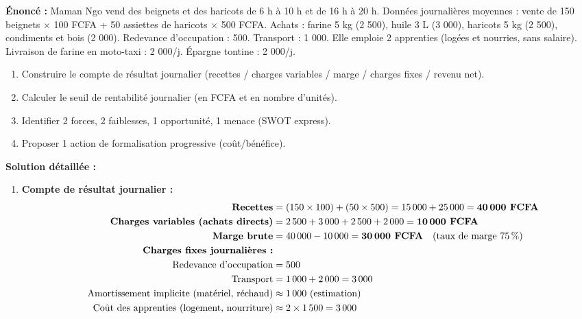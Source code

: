 \documentclass[11pt]{article}
\begin{document}
\begin{exoresolu}
    \textbf{Énoncé :} Maman Ngo vend des beignets et des haricots de 6 h à 10 h et de 16 h à 20 h. Données journalières moyennes : vente de 150 beignets $\times$ 100 FCFA + 50 assiettes de haricots $\times$ 500 FCFA. Achats : farine 5 kg (2 500), huile 3 L (3 000), haricots 5 kg (2 500), condiments et bois (2 000). Redevance d'occupation : 500. Transport : 1 000. Elle emploie 2 apprenties (logées et nourries, sans salaire). Livraison de farine en moto-taxi : 2 000/j. Épargne tontine : 2 000/j.
    \begin{enumerate}
        \item Construire le compte de résultat journalier (recettes / charges variables / marge / charges fixes / revenu net).
        \item Calculer le seuil de rentabilité journalier (en FCFA et en nombre d'unités).
        \item Identifier 2 forces, 2 faiblesses, 1 opportunité, 1 menace (SWOT express).
        \item Proposer 1 action de formalisation progressive (coût/bénéfice).
    \end{enumerate}
    \tcblower
    \textbf{Solution détaillée :}
    \begin{enumerate}
        \item \textbf{Compte de résultat journalier :}
              \begin{align*}
                  \textbf{Recettes} &= (150 \times 100) + (50 \times 500) = 15\,000 + 25\,000 = \textbf{40\,000 FCFA} \\
                  \textbf{Charges variables (achats directs)} &= 2\,500 + 3\,000 + 2\,500 + 2\,000 = \textbf{10\,000 FCFA} \\
                  \textbf{Marge brute} &= 40\,000 - 10\,000 = \textbf{30\,000 FCFA} \quad (\text{taux de marge } 75\,\%) \\
                  \textbf{Charges fixes journalières :} \\
                  \quad \text{Redevance d'occupation} &= 500 \\
                  \quad \text{Transport} &= 1\,000 + 2\,000 = 3\,000 \\
                  \quad \text{Amortissement implicite (matériel, réchaud)} &\approx 1\,000 \text{ (estimation)} \\
                  \quad \text{Coût des apprenties (logement, nourriture)} &\approx 2 \times 1\,500 = 3\,000 \\

\end{align*}
\end{enumerate}
\end{exoresolu}
\end{document}
